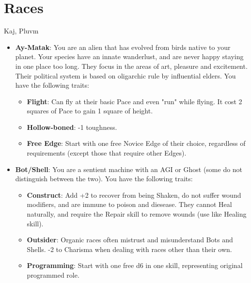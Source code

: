 \documentclass[10pt,twoside]{article}
\begin{document}
\begin{multicols}{2}
\begin{itemize}
\end{itemize}


\section{Races}

Kaj, Pluvm

\begin{itemize}

\item \textbf{Ay-Matak}: You are an alien that has evolved from birds native to your planet. Your species have an innate wanderlust, and are never happy staying in one place too long. They focus in the areas of art, pleasure and excitement. Their political system is based on oligarchic rule by influential elders. You have the following traits:
\begin{itemize}
    \item \textbf{Flight}: Can fly at their basic Pace and even "run" while flying. It cost 2 squares of Pace to gain 1 square of height.

    \item \textbf{Hollow-boned}: -1 toughness.

    \item \textbf{Free Edge}: Start with one free Novice Edge of their choice, regardless of requirements (except those that require other Edges).
\end{itemize}

\item \textbf{Bot/Shell}: You are a sentient machine with an AGI or Ghost (some do not distinguish between the two). You have the following traits:
\begin{itemize}
    \item \textbf{Construct}: Add +2 to recover from being Shaken, do not suffer wound modifiers, and are immune to poison and diesease. They cannot Heal naturally, and require the Repair skill to remove wounds (use like Healing skill).

    \item \textbf{Outsider}: Organic races often mistrust and misunderstand Bots and Shells. -2 to Charisma when dealing with races other than their own.

    \item \textbf{Programming}: Start with one free d6 in one skill, representing original programmed role.


\end{itemize}
\end{itemize}
\end{multicols}
\end{document}
